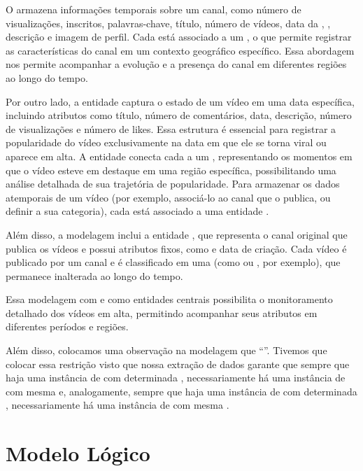   O  armazena informações temporais sobre um canal, como número de visualizações, inscritos, palavras-chave, título, número de vídeos, data da , , descrição e imagem de perfil. Cada  está associado a um , o que permite registrar as características do canal em um contexto geográfico específico. Essa abordagem nos permite acompanhar a evolução e a presença do canal em diferentes regiões ao longo do tempo.

  Por outro lado, a entidade  captura o estado de um vídeo em uma data específica, incluindo atributos como título, número de comentários, data, descrição, número de visualizações e número de likes. Essa estrutura é essencial para registrar a popularidade do vídeo exclusivamente na data em que ele se torna viral ou aparece em alta. A entidade  conecta cada  a um , representando os momentos em que o vídeo esteve em destaque em uma região específica, possibilitando uma análise detalhada de sua trajetória de popularidade. Para armazenar os dados atemporais de um vídeo (por exemplo, associá-lo ao canal que o publica, ou definir a sua categoria), cada  está associado a uma entidade .

  Além disso, a modelagem inclui a entidade , que representa o canal original que publica os vídeos e possui atributos fixos, como  e data de criação. Cada vídeo é publicado por um canal e é classificado em uma  (como  ou , por exemplo), que permanece inalterada ao longo do tempo.

  Essa modelagem com  e  como entidades centrais possibilita o monitoramento detalhado dos vídeos em alta, permitindo acompanhar seus atributos em diferentes períodos e regiões.

  Além disso, colocamos uma observação na modelagem que ``''. Tivemos que colocar essa restrição visto que nossa extração de dados garante que sempre que haja uma instância de  com determinada , necessariamente há uma instância de  com mesma  e, analogamente, sempre que haja uma instância de  com determinada , necessariamente há uma instância de  com mesma .

\newpage
\section{Modelo Lógico}

